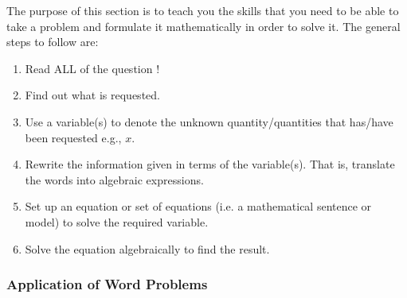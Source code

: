         
        \label{m39262*id161898}The purpose of this section is to teach you the skills that you need to be able to take a problem and formulate it mathematically in order to solve it. The general steps to follow are:\par 
        \label{m39262*id161903}\begin{enumerate}[noitemsep, label=\textbf{\arabic*}. ] 
            \label{m39262*uid104}\item Read ALL of the question !
\label{m39262*uid105}\item Find out what is requested.
\label{m39262*uid106}\item Use a variable(s) to denote the unknown quantity/quantities that has/have been requested e.g., \begin{math}x\end{math}.
\label{m39262*uid107}\item Rewrite the information given in terms of the variable(s). That is, translate the words into algebraic expressions. 
\label{m39262*uid108}\item Set up an equation or set of equations (i.e. a mathematical sentence or model) to solve the required variable.
\label{m39262*uid109}\item Solve the equation algebraically to find the result.
\end{enumerate}
        

      
      \label{m39262*uid110}
            \subsubsection{ Application of Word Problems}
            \nopagebreak
            \par
            \label{m39262*secfhsst!!!underscore!!!id6176}\vspace{.5cm} 
      
